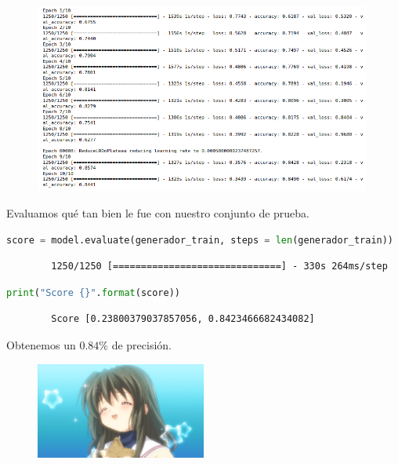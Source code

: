 \documentclass[letterpaper,11pt]{article}
\begin{document}
\begin{enumerate}
    \begin{figure}[ht]
        \centering
        \includegraphics[width=0.99\textwidth]{./imagenes/epochs.png}
    \end{figure} 

    Evaluamos qué tan bien le fue con nuestro conjunto de prueba.
    \begin{lstlisting}[language=Python]
    score = model.evaluate(generador_train, steps = len(generador_train))
    \end{lstlisting}

    \begin{verbatim}
        1250/1250 [==============================] - 330s 264ms/step
    \end{verbatim}
    
    \begin{lstlisting}[language=Python]
    print("Score {}".format(score))
    \end{lstlisting}

    \begin{verbatim}
        Score [0.23800379037857056, 0.8423466682434082]
    \end{verbatim}

    Obtenemos un $0.84\%$ de precisión.
    \begin{figure}[ht]
        \centering
        \includegraphics[width=0.5\textwidth]{./imagenes/fuko.png}
    \end{figure} 


\end{enumerate}
\end{document}
